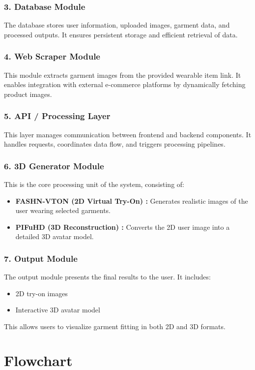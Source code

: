 \documentclass[12pt,a4paper,oneside]{report}
\begin{document}
\subsubsection{3. Database Module}
The database stores user information, uploaded images, garment data, and processed outputs. It ensures persistent storage and efficient retrieval of data.

\subsubsection{4. Web Scraper Module}
This module extracts garment images from the provided wearable item link. It enables integration with external e-commerce platforms by dynamically fetching product images.

\subsubsection{5. API / Processing Layer}
This layer manages communication between frontend and backend components. It handles requests, coordinates data flow, and triggers processing pipelines.

\subsubsection{6. 3D Generator Module}
This is the core processing unit of the system, consisting of:
\begin{itemize}
    \item \textbf{FASHN-VTON (2D Virtual Try-On) \cite{16}:} Generates realistic images of the user wearing selected garments.
    \item \textbf{PIFuHD (3D Reconstruction) \cite{1}:} Converts the 2D user image into a detailed 3D avatar model.
\end{itemize}

\subsubsection{7. Output Module}
The output module presents the final results to the user. It includes:
\begin{itemize}
    \item 2D try-on images
    \item Interactive 3D avatar model
\end{itemize}
This allows users to visualize garment fitting in both 2D and 3D formats.

\section{Flowchart}
\end{document}
